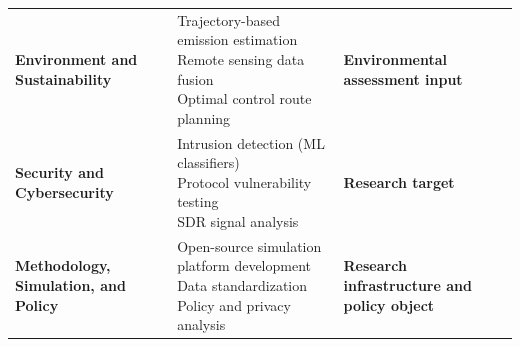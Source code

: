 \begin{table}[htbp]
\begin{tabular}{p{3cm} p{6cm} p{3cm}}
\textbf{Environment and Sustainability} &
\makecell[l]{
Trajectory-based emission estimation\\
Remote sensing data fusion\\
Optimal control route planning
} &
\textbf{Environmental assessment input} \\

\textbf{Security and Cybersecurity} &
\makecell[l]{
Intrusion detection (ML classifiers)\\
Protocol vulnerability testing\\
SDR signal analysis
} &
\textbf{Research target} \\
\hline

\textbf{Methodology, Simulation, and Policy} &
\makecell[l]{
Open-source simulation platform development\\
Data standardization\\
Policy and privacy analysis
} &
\textbf{Research infrastructure and policy object} \\
\hline
\end{tabular}
\label{tab:adsb_applications}
\end{table}


